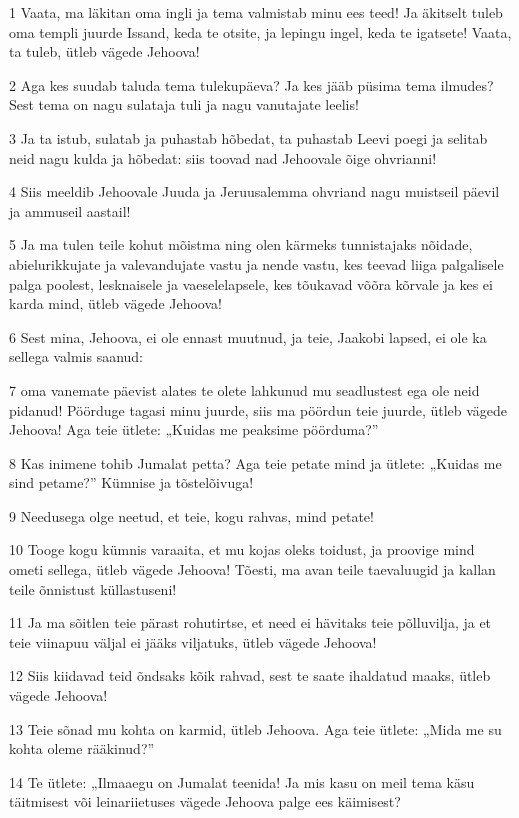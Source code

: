 \par 1 Vaata, ma läkitan oma ingli ja tema valmistab minu ees teed! Ja äkitselt tuleb oma templi juurde Issand, keda te otsite, ja lepingu ingel, keda te igatsete! Vaata, ta tuleb, ütleb vägede Jehoova!
\par 2 Aga kes suudab taluda tema tulekupäeva? Ja kes jääb püsima tema ilmudes? Sest tema on nagu sulataja tuli ja nagu vanutajate leelis!
\par 3 Ja ta istub, sulatab ja puhastab hõbedat, ta puhastab Leevi poegi ja selitab neid nagu kulda ja hõbedat: siis toovad nad Jehoovale õige ohvrianni!
\par 4 Siis meeldib Jehoovale Juuda ja Jeruusalemma ohvriand nagu muistseil päevil ja ammuseil aastail!
\par 5 Ja ma tulen teile kohut mõistma ning olen kärmeks tunnistajaks nõidade, abielurikkujate ja valevandujate vastu ja nende vastu, kes teevad liiga palgalisele palga poolest, lesknaisele ja vaeselelapsele, kes tõukavad võõra kõrvale ja kes ei karda mind, ütleb vägede Jehoova!
\par 6 Sest mina, Jehoova, ei ole ennast muutnud, ja teie, Jaakobi lapsed, ei ole ka sellega valmis saanud:
\par 7 oma vanemate päevist alates te olete lahkunud mu seadlustest ega ole neid pidanud! Pöörduge tagasi minu juurde, siis ma pöördun teie juurde, ütleb vägede Jehoova! Aga teie ütlete: „Kuidas me peaksime pöörduma?”
\par 8 Kas inimene tohib Jumalat petta? Aga teie petate mind ja ütlete: „Kuidas me sind petame?” Kümnise ja tõstelõivuga!
\par 9 Needusega olge neetud, et teie, kogu rahvas, mind petate!
\par 10 Tooge kogu kümnis varaaita, et mu kojas oleks toidust, ja proovige mind ometi sellega, ütleb vägede Jehoova! Tõesti, ma avan teile taevaluugid ja kallan teile õnnistust küllastuseni!
\par 11 Ja ma sõitlen teie pärast rohutirtse, et need ei hävitaks teie põlluvilja, ja et teie viinapuu väljal ei jääks viljatuks, ütleb vägede Jehoova!
\par 12 Siis kiidavad teid õndsaks kõik rahvad, sest te saate ihaldatud maaks, ütleb vägede Jehoova!
\par 13 Teie sõnad mu kohta on karmid, ütleb Jehoova. Aga teie ütlete: „Mida me su kohta oleme rääkinud?”
\par 14 Te ütlete: „Ilmaaegu on Jumalat teenida! Ja mis kasu on meil tema käsu täitmisest või leinariietuses vägede Jehoova palge ees käimisest?
